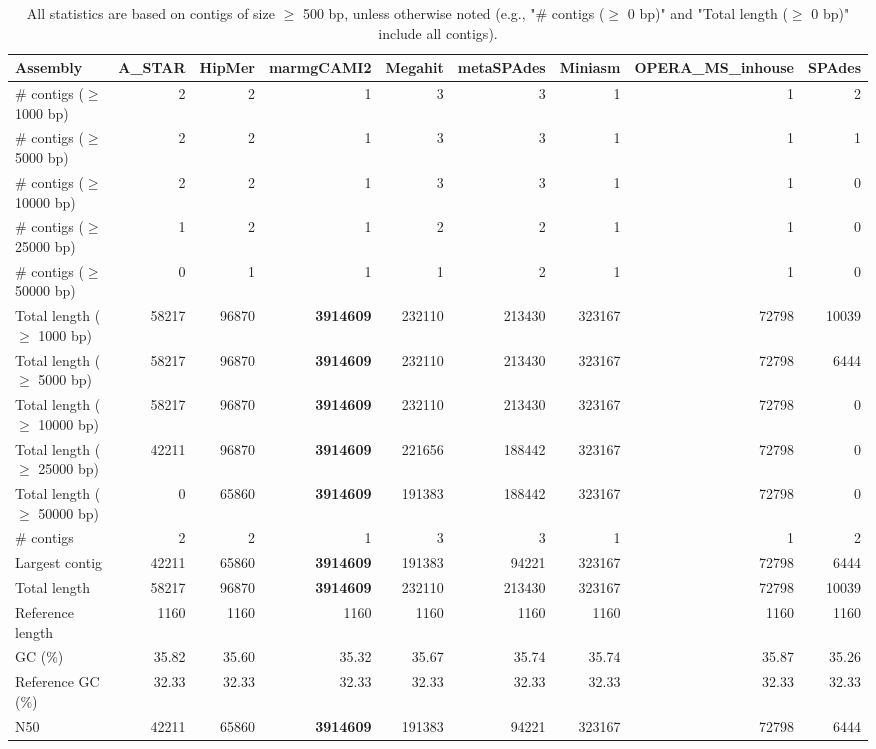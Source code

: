 \documentclass[12pt,a4paper]{article}
\begin{document}
\begin{table}[ht]
\begin{center}
\caption{All statistics are based on contigs of size $\geq$ 500 bp, unless otherwise noted (e.g., "\# contigs ($\geq$ 0 bp)" and "Total length ($\geq$ 0 bp)" include all contigs).}
\begin{tabular}{|l*{8}{|r}|}
\hline
Assembly & A\_STAR & HipMer & marmgCAMI2 & Megahit & metaSPAdes & Miniasm & OPERA\_MS\_inhouse & SPAdes \\ \hline
\# contigs ($\geq$ 1000 bp) & 2 & 2 & 1 & 3 & 3 & 1 & 1 & 2 \\ \hline
\# contigs ($\geq$ 5000 bp) & 2 & 2 & 1 & 3 & 3 & 1 & 1 & 1 \\ \hline
\# contigs ($\geq$ 10000 bp) & 2 & 2 & 1 & 3 & 3 & 1 & 1 & 0 \\ \hline
\# contigs ($\geq$ 25000 bp) & 1 & 2 & 1 & 2 & 2 & 1 & 1 & 0 \\ \hline
\# contigs ($\geq$ 50000 bp) & 0 & 1 & 1 & 1 & 2 & 1 & 1 & 0 \\ \hline
Total length ($\geq$ 1000 bp) & 58217 & 96870 & {\bf 3914609} & 232110 & 213430 & 323167 & 72798 & 10039 \\ \hline
Total length ($\geq$ 5000 bp) & 58217 & 96870 & {\bf 3914609} & 232110 & 213430 & 323167 & 72798 & 6444 \\ \hline
Total length ($\geq$ 10000 bp) & 58217 & 96870 & {\bf 3914609} & 232110 & 213430 & 323167 & 72798 & 0 \\ \hline
Total length ($\geq$ 25000 bp) & 42211 & 96870 & {\bf 3914609} & 221656 & 188442 & 323167 & 72798 & 0 \\ \hline
Total length ($\geq$ 50000 bp) & 0 & 65860 & {\bf 3914609} & 191383 & 188442 & 323167 & 72798 & 0 \\ \hline
\# contigs & 2 & 2 & 1 & 3 & 3 & 1 & 1 & 2 \\ \hline
Largest contig & 42211 & 65860 & {\bf 3914609} & 191383 & 94221 & 323167 & 72798 & 6444 \\ \hline
Total length & 58217 & 96870 & {\bf 3914609} & 232110 & 213430 & 323167 & 72798 & 10039 \\ \hline
Reference length & 1160 & 1160 & 1160 & 1160 & 1160 & 1160 & 1160 & 1160 \\ \hline
GC (\%) & 35.82 & 35.60 & 35.32 & 35.67 & 35.74 & 35.74 & 35.87 & 35.26 \\ \hline
Reference GC (\%) & 32.33 & 32.33 & 32.33 & 32.33 & 32.33 & 32.33 & 32.33 & 32.33 \\ \hline
N50 & 42211 & 65860 & {\bf 3914609} & 191383 & 94221 & 323167 & 72798 & 6444 \\ \hline

\end{tabular}
\end{center}
\end{table}
\end{document}
